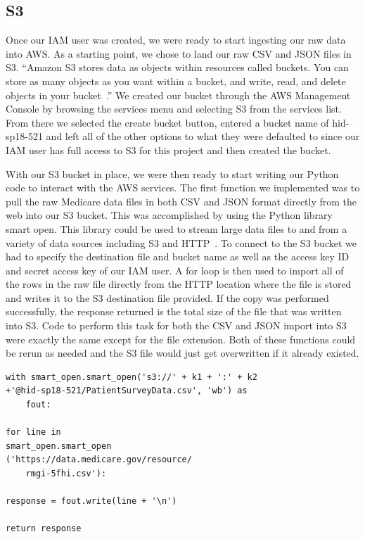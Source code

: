 \subsection{S3}

Once our IAM user was created, we were ready to start ingesting our raw data 
into AWS. As a starting point, we chose to land our raw CSV and JSON files in 
S3. ``Amazon S3 stores data as objects within resources called buckets. You 
can store as many objects as you want within a bucket, and write, read, and 
delete objects in your bucket~\cite{hid-sp18-521-S3features}.'' We created our 
bucket through the AWS Management Console by browsing the services menu and 
selecting S3 from the services list. From there we selected the create bucket 
button, entered a bucket name of hid-sp18-521 and left all of the other 
options to what they were defaulted to since our IAM user has full access to 
S3 for this project and then created the bucket. 

With our S3 bucket in place, we were then ready to start writing our Python 
code to interact with the AWS services. The first function we implemented was 
to pull the raw Medicare data files in both CSV and JSON format directly from 
the web into our S3 bucket. This was accomplished by using the Python library 
smart open. This library could be used to stream large data files to and from 
a variety of data sources including S3 and HTTP~\cite{hid-sp18-521-smartopen}. 
To connect to the S3 bucket we had to specify the destination file and bucket 
name as well as the access key ID and secret access key of our IAM user. A for 
loop is then used to import all of the rows in the raw file directly from the 
HTTP location where the file is stored and writes it to the S3 destination 
file provided. If the copy was performed successfully, the response returned 
is the total size of the file that was written into S3. Code to perform this 
task for both the CSV and JSON import into S3 were exactly the same except for 
the file extension. Both of these functions could be rerun as needed and the 
S3 file would just get overwritten if it already existed. 

\begin{verbatim}
with smart_open.smart_open('s3://' + k1 + ':' + k2 
+'@hid-sp18-521/PatientSurveyData.csv', 'wb') as 
	fout:

for line in 
smart_open.smart_open
('https://data.medicare.gov/resource/
	rmgi-5fhi.csv'):
       
response = fout.write(line + '\n')

return response
\end{verbatim}

